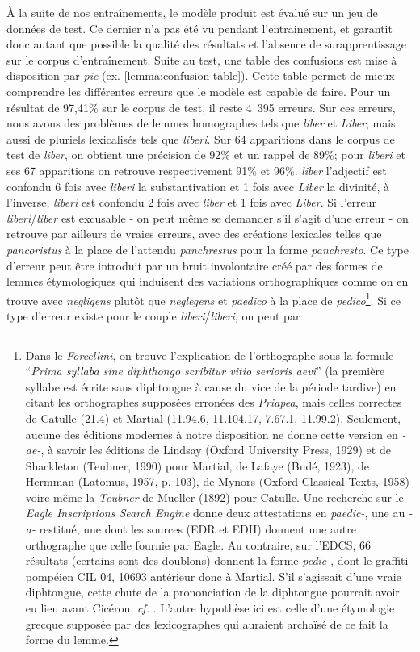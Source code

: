 À la suite de nos entraînements, le modèle produit est évalué sur un jeu de données de test. Ce dernier n'a pas été vu pendant l'entrainement, et garantit donc autant que possible la qualité des résultats et l'absence de surapprentissage sur le corpus d'entraînement. Suite au test, une table des confusions est mise à disposition par \textit{pie} (ex. \ref{lemma:confusion-table}). Cette table permet de mieux comprendre les différentes erreurs que le modèle est capable de faire. Pour un résultat de 97,41\% sur le corpus de test, il reste 4~395 erreurs. Sur ces erreurs, nous avons des problèmes de lemmes homographes tels que \textit{liber} et \textit{Liber}, mais aussi de pluriels lexicalisés tels que \textit{liberi}. Sur 64 apparitions dans le corpus de test de \textit{liber}, on obtient une précision de 92\% et un rappel de 89\%; pour \textit{liberi} et ses 67 apparitions on retrouve respectivement 91\% et 96\%. \textit{liber} l'adjectif est confondu 6 fois avec \textit{liberi} la substantivation et 1 fois avec \textit{Liber} la divinité, à l'inverse, \textit{liberi} est confondu 2 fois avec \textit{liber} et 1 fois avec \textit{Liber}. Si l'erreur \textit{liberi}/\textit{liber} est excusable - on peut même se demander s'il s'agit d'une erreur - on retrouve par ailleurs de vraies erreurs, avec des créations lexicales telles que \textit{pancoristus} à la place de l'attendu \textit{panchrestus} pour la forme \textit{panchresto}. Ce type d'erreur peut être introduit par un bruit involontaire créé par des formes de lemmes étymologiques qui induisent des variations orthographiques comme on en trouve avec \textit{negligens} plutôt que \textit{neglegens} et \textit{paedico} à la place de \textit{pedico}\footnote{Dans le \textit{Forcellini}, on trouve l'explication de l'orthographe sous la formule \enquote{\textit{Prima syllaba sine diphthongo scribitur vitio serioris aevi}} (la première syllabe est écrite sans diphtongue à cause du vice de la période tardive) en citant les orthographes supposées erronées des \textit{Priapea}, mais celles correctes de Catulle (21.4) et Martial (11.94.6, 11.104.17, 7.67.1, 11.99.2). Seulement, aucune des éditions modernes à notre disposition ne donne cette version en \textit{-ae-}, à savoir les éditions de Lindsay (Oxford University Press, 1929) et de Shackleton (Teubner, 1990) pour Martial, de Lafaye (Budé, 1923), de Hermman (Latomus, 1957, p. 103), de Mynors (Oxford Classical Texts, 1958) voire même la \textit{Teubner} de Mueller (1892) pour Catulle. Une recherche sur le \textit{Eagle Inscriptions Search Engine} donne deux attestations en \textit{paedic-}, une au \textit{-a-} restitué, une dont les sources (EDR et EDH) donnent une autre orthographe que celle fournie par Eagle. Au contraire, sur l'EDCS, 66 résultats (certains sont des doublons) donnent la forme \textit{pedic-}, dont le graffiti pompéien CIL 04, 10693 antérieur donc à Martial. S'il s'agissait d'une vraie diphtongue, cette chute de la prononciation de la diphtongue pourrait avoir eu lieu avant Cicéron, \textit{cf.} \cite{sturtevant_monophthongization_1916}. L'autre hypothèse ici est celle d'une étymologie grecque supposée par des lexicographes qui auraient archaïsé de ce fait la forme du lemme.}. Si ce type d'erreur existe pour le couple \textit{liberi}/\textit{liberi}, on peut par 